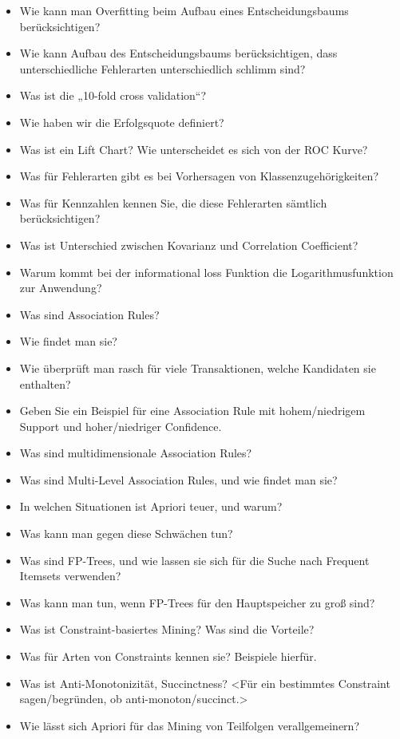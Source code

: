 \documentclass[paper=a4, fontsize=11pt]{scrartcl} %
\numberwithin{equation}{section} %
\numberwithin{figure}{section} %
\numberwithin{table}{section} %
\begin{document}
\begin{itemize}
\item Wie kann man Overfitting beim Aufbau eines Entscheidungsbaums berücksichtigen?
\item Wie kann Aufbau des Entscheidungsbaums berücksichtigen, dass unterschiedliche Fehlerarten unterschiedlich schlimm sind?
\item Was ist die „10-fold cross validation“?
\item Wie haben wir die Erfolgsquote definiert?
\item Was ist ein Lift Chart? Wie unterscheidet es sich von der ROC Kurve?
\item Was für Fehlerarten gibt es bei Vorhersagen von Klassenzugehörigkeiten?
\item Was für Kennzahlen kennen Sie, die diese Fehlerarten sämtlich berücksichtigen?
\item Was ist Unterschied zwischen Kovarianz und Correlation Coefficient?
\item Warum kommt bei der informational loss Funktion die Logarithmusfunktion zur Anwendung?
\item Was sind Association Rules?
\item Wie findet man sie?
\item Wie überprüft man rasch für viele Transaktionen, welche Kandidaten sie enthalten?
\item Geben Sie ein Beispiel für eine Association Rule mit hohem/niedrigem Support und hoher/niedriger Confidence.
\item Was sind multidimensionale Association Rules?
\item Was sind Multi-Level Association Rules, und wie findet man sie?
\item In welchen Situationen ist Apriori teuer, und warum?
\item Was kann man gegen diese Schwächen tun?
\item Was sind FP-Trees, und wie lassen sie sich für die Suche nach Frequent Itemsets verwenden?
\item Was kann man tun, wenn FP-Trees für den Hauptspeicher zu groß sind?
\item Was ist Constraint-basiertes Mining? Was sind die Vorteile?
\item Was für Arten von Constraints kennen sie? Beispiele hierfür.
\item Was ist Anti-Monotonizität, Succinctness? <Für ein bestimmtes Constraint sagen/begründen, ob anti-monoton/succinct.>
\item Wie lässt sich Apriori für das Mining von Teilfolgen verallgemeinern?

\end{itemize}
\end{document}
